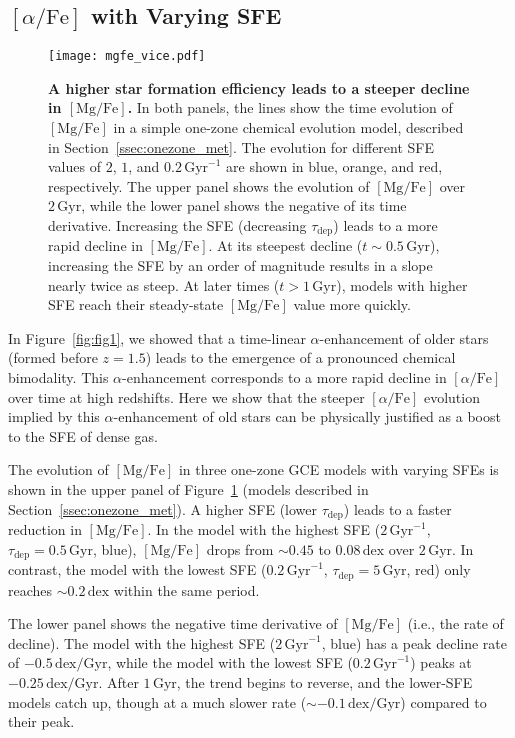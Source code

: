 \documentclass[twocolumn,linenumbers]{aastex631}
\newcommand{\Gyr}{\ensuremath{\textrm{Gyr}}}
\newcommand{\MgFe}{\ensuremath{[\textrm{Mg}/\textrm{Fe}]}}
\newcommand{\alphaFe}{\ensuremath{[\alpha/\textrm{Fe}]}}
\newcommand{\dex}{\ensuremath{\textrm{dex}}}
\begin{document}
\subsection{\alphaFe{} with Varying SFE}\label{ssec:onezone}

\begin{figure}
  \centering
  \texttt{[image: mgfe\_vice.pdf]}
  \caption{\textbf{A higher star formation efficiency leads to a steeper decline in \MgFe{}.} In both panels, the lines show the time evolution of \MgFe{} in a simple one-zone chemical evolution model, described in Section~\ref{ssec:onezone_met}. The evolution for different SFE values of $2$, $1$, and $0.2\,\textrm{Gyr}^{-1}$ are shown in blue, orange, and red, respectively.  The upper panel shows the evolution of \MgFe{} over $2\,\Gyr$, while the lower panel shows the negative of its time derivative. Increasing the SFE (decreasing $\tau_{\textrm{dep}}$) leads to a more rapid decline in \MgFe{}. At its steepest decline ($t\sim0.5\,\Gyr$), increasing the SFE by an order of magnitude results in a slope nearly twice as steep. At later times ($t > 1\,\Gyr$), models with higher SFE reach their steady-state \MgFe{} value more quickly.}
  \label{fig:vice}
\end{figure}

In Figure~\ref{fig:fig1}, we showed that a time-linear $\alpha$-enhancement of older stars (formed before $z=1.5$) leads to the emergence of a pronounced chemical bimodality. This $\alpha$-enhancement corresponds to a more rapid decline in \alphaFe{} over time at high redshifts. Here we show that the steeper \alphaFe{} evolution implied by this $\alpha$-enhancement of old stars can be physically justified as a boost to the SFE of dense gas.

The evolution of \MgFe{} in three one-zone GCE models with varying SFEs is shown in the upper panel of Figure~\ref{fig:vice} (models described in Section~\ref{ssec:onezone_met}). A higher SFE (lower $\tau_{\textrm{dep}}$) leads to a faster reduction in \MgFe{}. In the model with the highest SFE ($2\,\Gyr^{-1}$, $\tau_{\textrm{dep}}=0.5\,\Gyr$, blue), \MgFe{} drops from $\sim0.45$ to $0.08\,\dex$ over $2\,\Gyr$. In contrast, the model with the lowest SFE ($0.2\,\Gyr^{-1}$, $\tau_{\textrm{dep}}=5\,\Gyr$, red) only reaches $\sim0.2\,\dex$ within the same period.

The lower panel shows the negative time derivative of \MgFe{} (i.e., the rate of decline). The model with the highest SFE ($2\,\Gyr^{-1}$, blue) has a peak decline rate of $-0.5\,\dex/\Gyr$, while the model with the lowest SFE ($0.2\,\Gyr^{-1}$) peaks at $-0.25\,\dex/\Gyr$. After $1\,\Gyr$, the trend begins to reverse, and the lower-SFE models catch up, though at a much slower rate ($\sim-0.1\,\dex/\Gyr$) compared to their peak.
\end{document}
